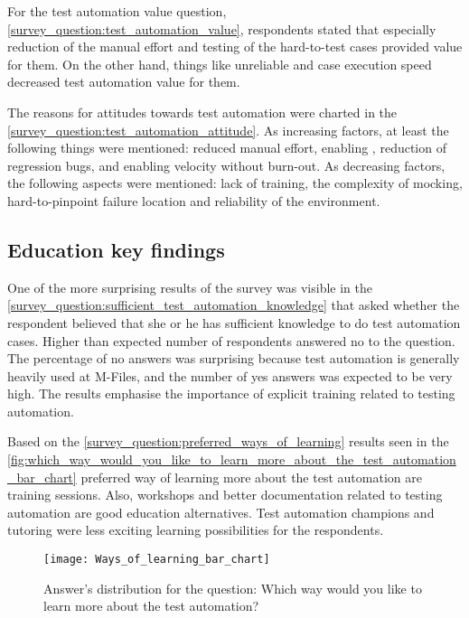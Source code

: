 For the test automation value question, \autoref{survey_question:test_automation_value}, respondents stated that especially reduction of the manual effort and testing of the hard-to-test cases provided value for them. On the other hand, things like unreliable and case execution speed decreased test automation value for them.

The reasons for attitudes towards test automation were charted in the \autoref{survey_question:test_automation_attitude}. As increasing factors, at least the following things were mentioned: reduced manual effort, enabling , reduction of regression bugs, and enabling velocity without burn-out. As decreasing factors, the following aspects were mentioned: lack of training, the complexity of mocking, hard-to-pinpoint failure location and reliability of the environment.

\subsection{Education key findings}
One of the more surprising results of the survey was visible in the \autoref{survey_question:sufficient_test_automation_knowledge} that asked whether the respondent believed that she or he has sufficient knowledge to do test automation cases. Higher than expected number of respondents answered no to the question. The percentage of no answers was surprising because test automation is generally heavily used at M-Files, and the number of yes answers was expected to be very high. The results emphasise the importance of explicit training related to testing automation.

Based on the \autoref{survey_question:preferred_ways_of_learning} results seen in the \autoref{fig:which_way_would_you_like_to_learn_more_about_the_test_automation_bar_chart} preferred way of learning more about the test automation are training sessions. Also, workshops and better documentation related to testing automation are good education alternatives. Test automation champions and tutoring were less exciting learning possibilities for the respondents.

\begin{figure}
	\centering
	\texttt{[image: Ways\_of\_learning\_bar\_chart]}
	\caption{Answer's distribution for the question: Which way would you like to learn more about the test automation?}
	\label{fig:which_way_would_you_like_to_learn_more_about_the_test_automation_bar_chart}
\end{figure}
\FloatBarrier

